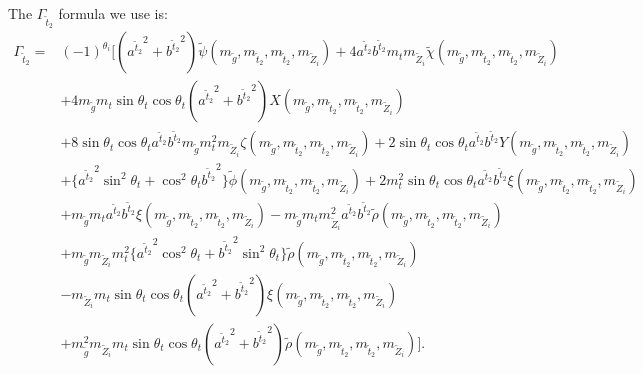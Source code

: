 \documentclass[final,3p,times,pdflatex]{elsarticle}
\begin{document}
The $\Gamma_{\tilde{t}_2}$ formula we use is:
\begin{equation}
\begin{aligned}
\Gamma_{\tilde{t}_2} = & (-1)^{\theta_i}\Big[({a^{\tilde{t}_2}}^2+{b^{\tilde{t}_2}}^2)\tilde{\psi} (m_{\tilde{g}},m_{\tilde{t}_2}, m_{\tilde{t}_2}, m_{\tilde{Z}_i})  + 4 a^{\tilde{t}_2} b^{\tilde{t}_2} m_{t} m_{\tilde{Z}_i} \tilde{\chi} (m_{\tilde{g}},m_{\tilde{t}_2}, m_{\tilde{t}_2}, m_{\tilde{Z}_i}) \\ & + 4 m_{\tilde{g}}m_{t}\sin\theta_{t}\cos\theta_{t}({a^{\tilde{t}_2}}^2 + {b^{\tilde{t}_2}}^2) X(m_{\tilde{g}},m_{\tilde{t}_2}, m_{\tilde{t}_2}, m_{\tilde{Z}_i}) \\ & + 8\sin\theta_t \cos\theta_t a^{\tilde{t}_2} b^{\tilde{t}_2}m_{\tilde{g}}m_{t}^2 m_{\tilde{Z}_{i}} \zeta (m_{\tilde{g}},m_{\tilde{t}_2}, m_{\tilde{t}_2}, m_{\tilde{Z}_i}) + 2\sin\theta_t \cos\theta_t a^{\tilde{t}_2} b^{\tilde{t}_2} Y(m_{\tilde{g}},m_{\tilde{t}_2}, m_{\tilde{t}_2}, m_{\tilde{Z}_i}) \\ & + \{{a^{\tilde{t}_2}}^2 \sin^2 \theta_t  + \cos^2 \theta_t {b^{\tilde{t}_2}}^2\} \tilde{\phi} (m_{\tilde{g}},m_{\tilde{t}_2}, m_{\tilde{t}_2}, m_{\tilde{Z}_i}) + 2m_{t}^2 \sin\theta_t \cos\theta_t a^{\tilde{t}_2} b^{\tilde{t}_2} \xi (m_{\tilde{g}},m_{\tilde{t}_2}, m_{\tilde{t}_2}, m_{\tilde{Z}_i})  \\ & + m_{\tilde{g}}m_{t} a^{\tilde{t}_2} b^{\tilde{t}_2} \xi (m_{\tilde{g}},m_{\tilde{t}_2}, m_{\tilde{t}_2}, m_{\tilde{Z}_i}) -m_{\tilde{g}}m_{t} m_{\tilde{Z}_i}^2 a^{\tilde{t}_2} b^{\tilde{t}_2} \tilde{\rho} (m_{\tilde{g}},m_{\tilde{t}_2}, m_{\tilde{t}_2}, m_{\tilde{Z}_i}) \\ & + m_{\tilde{g}}m_{\tilde{Z}_i} m_{t}^2 \{{a^{\tilde{t}_2}}^2 \cos^2 \theta_t + {b^{\tilde{t}_2}}^2 \sin^2 \theta_t \} \tilde{\rho} (m_{\tilde{g}},m_{\tilde{t}_2}, m_{\tilde{t}_2}, m_{\tilde{Z}_i}) \\ & - m_{\tilde{Z}_i} m_{t} \sin\theta_t \cos \theta_t ({a^{\tilde{t}_2}}^2 + {b^{\tilde{t}_2}}^2) \xi (m_{\tilde{g}},m_{\tilde{t}_2}, m_{\tilde{t}_2}, m_{\tilde{Z}_i}) \\ & + m_{\tilde{g}}^2 m_{\tilde{Z}_i} m_{t} \sin \theta_t \cos \theta_t ({a^{\tilde{t}_2}}^2 + {b^{\tilde{t}_2}}^2) \tilde{\rho} (m_{\tilde{g}},m_{\tilde{t}_2}, m_{\tilde{t}_2}, m_{\tilde{Z}_i})\Big].
\end{aligned}
\end{equation}
\end{document}
